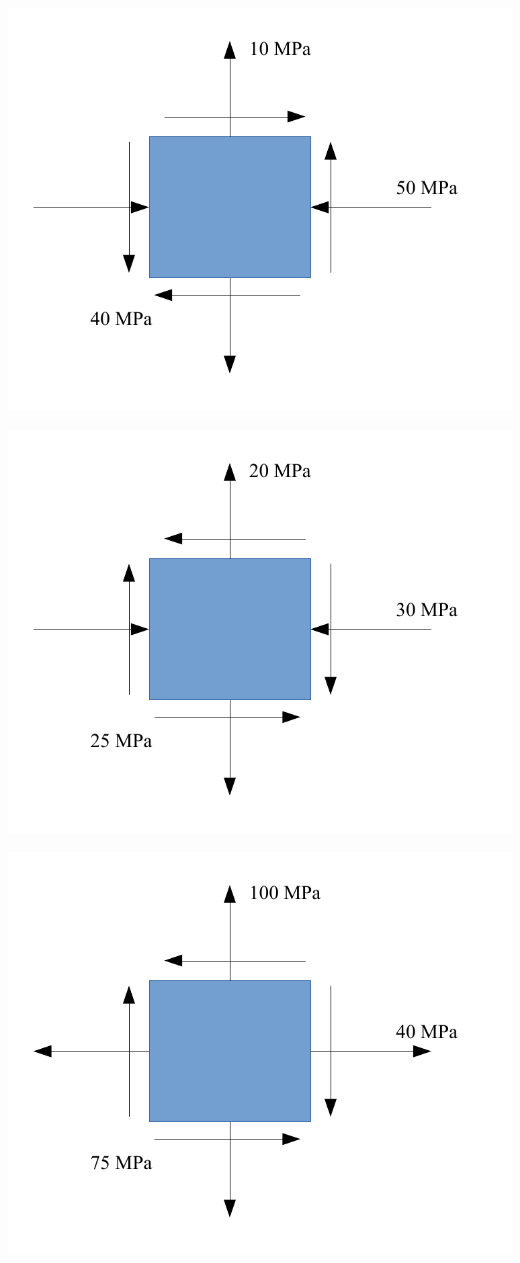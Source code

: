 \documentclass[a4paper,openany,nobib]{tufte-book}
\begin{document}
\begin{center}
\includegraphics[width=.9\linewidth]{pictures/Static-body-load-analysis/plane-stress-exercise1.pdf}
\end{center}
\begin{center}
\includegraphics[width=.9\linewidth]{pictures/Static-body-load-analysis/plane-stress-exercise2.pdf}
\end{center}
\begin{center}
\includegraphics[width=.9\linewidth]{pictures/Static-body-load-analysis/plane-stress-exercise3.pdf}
\end{center}
\end{document}
